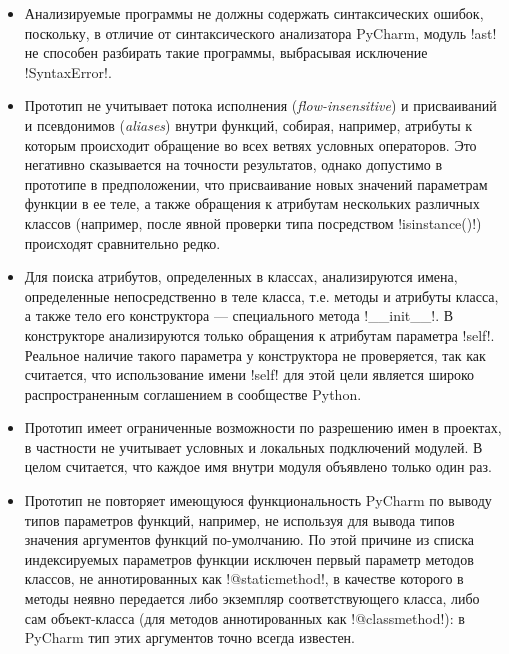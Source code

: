 \begin{itemize} 
  \item Анализируемые программы не должны содержать синтаксических ошибок,
    поскольку, в отличие от синтаксического анализатора PyCharm, модуль !ast! не
    способен разбирать такие программы, выбрасывая исключение !SyntaxError!.

  \item Прототип не учитывает потока исполнения (\emph{flow-insensitive}) и
    присваиваний и псевдонимов (\emph{aliases}) внутри функций, собирая, например,
    атрибуты к которым происходит обращение во всех ветвях условных операторов.
    Это негативно сказывается на точности результатов, однако допустимо в
    прототипе в предположении, что присваивание новых значений параметрам
    функции в ее теле, а также обращения к атрибутам нескольких различных
    классов (например, после явной проверки типа посредством !isinstance()!)
    происходят сравнительно редко.

  \item Для поиска атрибутов, определенных в классах, анализируются имена,
    определенные непосредственно в теле класса, т.е. методы и атрибуты
    класса, а также тело его конструктора --- специального метода !__init__!. В
    конструкторе анализируются только обращения к атрибутам параметра !self!.
    Реальное наличие такого параметра у конструктора не проверяется, так как
    считается, что использование имени !self! для этой цели является широко
    распространенным соглашением в сообществе Python.

  \item Прототип имеет ограниченные возможности по разрешению имен в проектах, в
    частности не учитывает условных и локальных подключений модулей. В целом
    считается, что каждое имя внутри модуля объявлено только один раз.

  \item Прототип не повторяет имеющуюся функциональность PyCharm по выводу
    типов параметров функций, например, не используя для вывода типов значения
    аргументов функций по-умолчанию. По этой причине из списка индексируемых
    параметров функции исключен первый параметр методов классов, не
    аннотированных как !@staticmethod!, в качестве которого в методы неявно
    передается либо экземпляр соответствующего класса, либо сам объект-класса
    (для методов аннотированных как !@classmethod!): в PyCharm тип этих
    аргументов точно всегда известен.  

\end{itemize}


